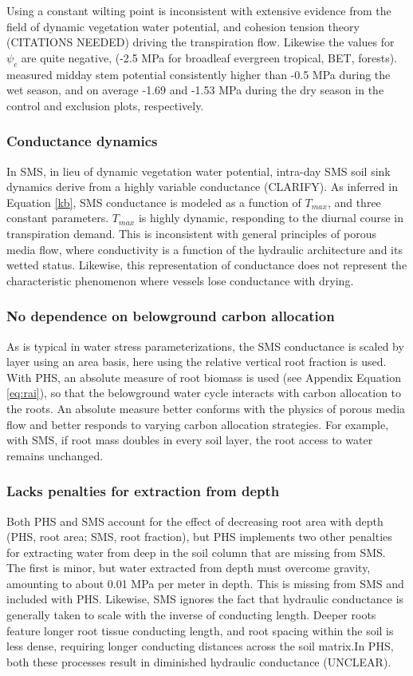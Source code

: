 \documentclass[draft,linenumbers]{agujournal}
\begin{document}
    Using a constant wilting point is inconsistent with extensive evidence from the field of dynamic vegetation water potential, and cohesion tension theory (CITATIONS NEEDED) driving the transpiration flow. Likewise the values for $\psi_{c}$ are quite negative, (-2.5 MPa for broadleaf evergreen tropical, BET, forests). \cite{fisher2006} measured midday stem potential consistently higher than -0.5 MPa during the wet season, and on average -1.69 and -1.53 MPa during the dry season in the control and exclusion plots, respectively.
    
    \subsubsection{Conductance dynamics}
    In SMS, in lieu of dynamic vegetation water potential, intra-day SMS soil sink dynamics derive from a highly variable conductance (CLARIFY). As inferred in Equation \ref{kb}, SMS conductance is modeled as a function of $T_{max}$, and three constant parameters. $T_{max}$ is highly dynamic, responding to the diurnal course in transpiration demand. This is inconsistent with general principles of porous media flow, where conductivity is a function of the hydraulic architecture and its wetted status.    Likewise, this representation of conductance does not represent the characteristic phenomenon where vessels lose conductance with drying.
      
    \subsubsection{No dependence on belowground carbon allocation}
    As is typical in water stress parameterizations, the SMS conductance is scaled by layer using an area basis, here using the relative vertical root fraction is used. With PHS, an absolute measure of root biomass is used (see Appendix Equation \ref{eq:rai}), so that the belowground water cycle interacts with carbon allocation to the roots. An absolute measure better conforms with the physics of porous media flow and better responds to varying carbon allocation strategies. For example, with SMS, if root mass doubles in every soil layer, the root access to water remains unchanged.

    \subsubsection{Lacks penalties for extraction from depth}
    Both PHS and SMS account for the effect of decreasing root area with depth (PHS, root area; SMS, root fraction), but PHS implements two other penalties for extracting water from deep in the soil column that are missing from SMS. The first is minor, but water extracted from depth must overcome gravity, amounting to about 0.01 MPa per meter in depth. This is missing from SMS and included with PHS.  Likewise, SMS ignores the fact that hydraulic conductance is generally taken to scale with the inverse of conducting length. Deeper roots feature longer root tissue conducting length, and root spacing within the soil is less dense, requiring longer conducting distances across the soil matrix.In PHS, both these processes result in diminished hydraulic conductance (UNCLEAR).
\end{document}

